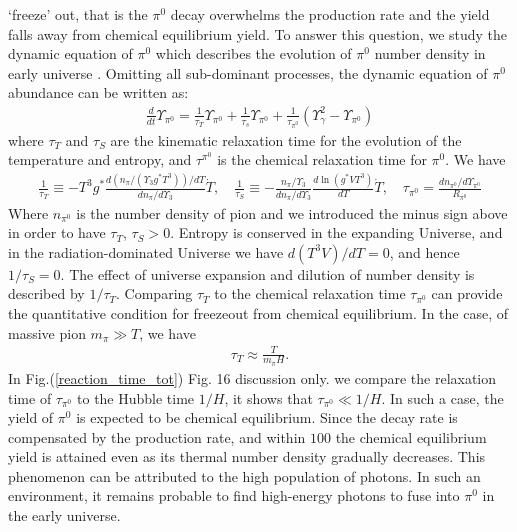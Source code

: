\documentclass[universe,article,submit,moreauthors,pdftex,a4paper]{Definitions/mdpi}
\newcommand*{\xred}{\color{red}}
\begin{document}
`freeze' out, that is the $\pi^0$ decay overwhelms the production rate and the yield
falls away from chemical equilibrium yield. To answer this question, we study the dynamic equation of $\pi^0$ which describes the evolution of $\pi^0$ number density in early universe \cite{Fromerth:2012fe}. Omitting all sub-dominant processes, the dynamic equation of $\pi^0$ abundance can be written as:
\begin{align}
\frac{d}{dt}\Upsilon_{\pi^0}=\frac{1}{\tau_T}\Upsilon_{\pi^0}+\frac{1}{\tau_s}\Upsilon_{\pi^0}+\frac{1}{\tau_{\pi^0}}\left(\Upsilon^2_\gamma-\Upsilon_{\pi^0}\right)
\end{align}
where $\tau_T$ and $\tau_S$ are the kinematic relaxation time for the evolution of the temperature and entropy, and $\tau^{\pi^0}$ is the chemical relaxation time for $\pi^0$. We have
\begin{align}
\frac{1}{\tau_T}\equiv -T^3g^*\frac{d (n_{\pi}/(\Upsilon_3
g^*T^3))/dT}{dn_{\pi}/d{\Upsilon_3}}{\dot T},\label{tauT} \quad
\frac{1}{\tau_{S}}\equiv
-\frac{n_{\pi}/\Upsilon_3}{dn_{\pi}/d{\Upsilon_3}}\frac{d\ln (g^*VT^3)}{dT}
\dot{T},\quad
\tau_{\pi^0}=\frac{dn_{\pi^0}/d\Upsilon_{\pi^0}}{R_{\pi^0}} 
\end{align}
Where $n_{\pi^0}$ is the number density of pion and we introduced the minus sign above in order to have $\tau_T$, $\tau_S>0$. Entropy is conserved in the expanding Universe, and in the radiation-dominated Universe we have $d(T^3V)/dT=0$, and hence $1/\tau_S=0$. The effect of universe expansion and dilution of number density is described by $1/\tau_T$. Comparing $\tau_T$ to the chemical relaxation time $\tau_{\pi^0}$ can provide the quantitative condition for freezeout from chemical equilibrium. In the case, of massive pion $m_{\pi}\gg T$, we have \cite{Kuznetsova:2009xh}
\begin{align}
\tau_T\approx\frac{T}{m_{\pi}H}.
\end{align}
 In Fig.(\ref{reaction_time_tot}) {\xred Fig. 16 discussion only.} we compare the relaxation time of $\tau_{\pi^0}$ to the Hubble time $1/H$, it shows that $\tau_{\pi^0}\ll 1/H$. In such a case, the yield of $\pi^0$ is expected to be chemical equilibrium. Since the decay rate is compensated by the production rate, and within $100$ the chemical equilibrium yield is attained even as its thermal number density gradually decreases. This phenomenon can be attributed to the high population of photons. In such an environment, it remains probable to find high-energy photons to fuse into $\pi^0$ in the early universe. 
\end{document}
